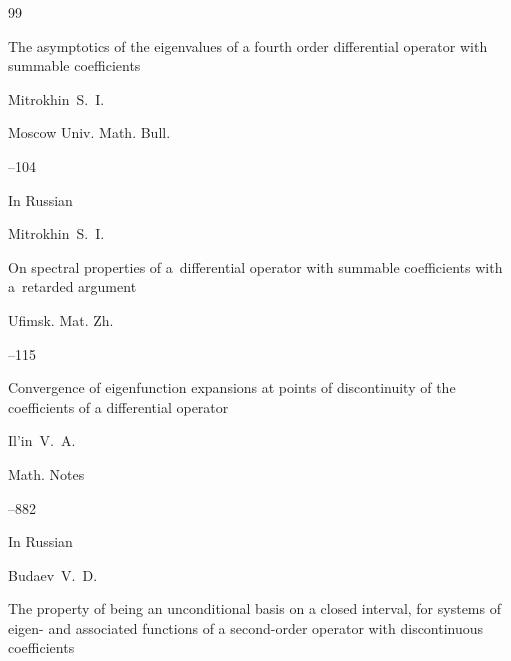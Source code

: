 \begin{thebibliography}{99}




\paper  The asymptotics of the eigenvalues of a fourth order differential operator with summable coefficients

\by Mitrokhin~S.~I.


\jour Moscow Univ. Math. Bull. 



--104








\lang In Russian

\by Mitrokhin~S.~I.

\paper On spectral properties of a~differential operator with summable coefficients with a~retarded argument

\jour Ufimsk. Mat. Zh.




--115






\paper Convergence of eigenfunction expansions at points of discontinuity of the coefficients of a differential operator

\by Il'in~V.~A.

\jour Math. Notes




--882





\lang In Russian

\by Budaev~V.~D.

\paper The property of being an unconditional basis on a closed interval, for systems of eigen- and associated functions of a second-order operator with discontinuous coefficients


\end{thebibliography}
